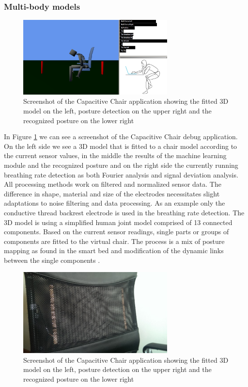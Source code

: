 \subsubsection{Multi-body models}
\begin{figure}[h]
\centering
\includegraphics[width=0.7\textwidth]{images/smartchair_software}
\caption{Screenshot of the Capacitive Chair application showing the fitted 3D model on the left, posture detection on the upper right and the recognized posture on the lower right}
\label{fig:smartchair_software}
\end{figure}
In Figure \ref{fig:smartchair_software} we can see a screenshot of the Capacitive Chair debug application. On the left side we see a 3D model that is fitted to a chair model according to the current sensor values, in the middle the results of the machine learning module and the recognized posture and on the right side the currently running breathing rate detection as both Fourier analysis and signal deviation analysis.
All processing methods work on filtered and normalized sensor data. The difference in shape, material and size of the electrodes necessitates slight adaptations to noise filtering and data processing. As an example only the conductive thread backrest electrode is used in the breathing rate detection. 
The 3D model is using a simplified human joint model comprised of 13 connected components. Based on the current sensor readings, single parts or groups of components are fitted to the virtual chair. The process is a mix of posture mapping as found in the smart bed and modification of the dynamic links between the single components \cite{Braun2013ChairAid}.
\begin{figure}[h]
\centering
\includegraphics[width=0.7\textwidth]{images/smartchair_thread}
\caption{Screenshot of the Capacitive Chair application showing the fitted 3D model on the left, posture detection on the upper right and the recognized posture on the lower right}
\label{fig:smartchair_thread}
\end{figure}
